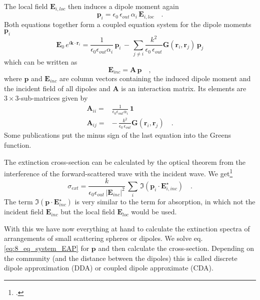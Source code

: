 The local field $\mathbf{E}_{i, loc}$ then induces a dipole moment again 
\begin{equation}
\mathbf{p}_i = \epsilon_0 \, \epsilon_{out} \, \alpha_i \, \mathbf{E}_{i,loc} \quad .
\end{equation}
Both equations together form a coupled equation system for the 
 dipole moments $ \mathbf{p}_i$
\begin{equation}
\mathbf{E}_{0} \, e^{i \mathbf{k} \cdot \mathbf{r}_i} =
\frac{1}{\epsilon_0 \epsilon_{out} \alpha_i} \, \mathbf{p}_i 
 \,  - \, 
 \sum_{j \neq i} \frac{k^2}{\epsilon_0 \, \epsilon_{out}} 
 \mathbf{G}(\mathbf{r}_i, \mathbf{r}_j)  \, \mathbf{p}_j 
\end{equation} 
 which can be written as
 \begin{equation}
 \mathbf{E}_{inc} = \mathbf{A} \, \mathbf{p} \quad , \label{eq:8_eq_system_EAP}
 \end{equation}
where $\mathbf{p}$ and $ \mathbf{E}_{inc} $ are column vectors containing the induced dipole moment and the incident field of all dipoles and $\mathbf{A} $ is an interaction matrix. Its elements are $3 \times 3$-sub-matrices given by
 \begin{align}
 \mathbf{A}_{ii} = &\frac{1}{\epsilon_0 \epsilon_{out} \alpha_i} \, \mathbf{1} \\
 \mathbf{A}_{ij} = & - \, 
 \frac{k^2}{\epsilon_0 \, \epsilon_{out}} 
 \mathbf{G}(\mathbf{r}_i, \mathbf{r}_j)  \quad .
 \end{align}
Some publications put the minus sign of the last equation into the Greens function. 


The extinction cross-section can be calculated by the optical theorem from the interference of the forward-scattered wave with the incident wave. We get\footcite{Draine88,Yurkin07}
\begin{equation}
\sigma_{ext} = \frac{k}{\epsilon_0 \epsilon_{out}  \, |\mathbf{E}_{inc}|^2} \, \sum_i \, \Im ( \mathbf{p}_i \cdot \mathbf{E}_{i, inc}^\star ) \quad .
\end{equation}
The term $\Im ( \mathbf{p} \cdot \mathbf{E}_{inc}^\star )$ is very similar to the term for absorption, in which not the incident field $\mathbf{E}_{inc} $ but the local field $\mathbf{E}_{loc} $ would be used.



 
With this we have now everything at hand to calculate the  extinction spectra of arrangements  of small scattering spheres or dipoles. We solve eq. \ref{eq:8_eq_system_EAP} for $\mathbf{p}$ and then calculate the cross-section. Depending on the community (and the distance between the dipoles) this is called discrete dipole approximation (DDA) or coupled dipole approximate (CDA).
 
